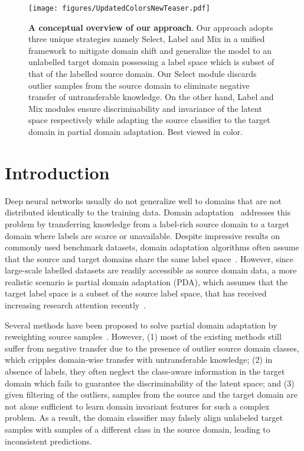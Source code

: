 \documentclass[10pt,twocolumn,letterpaper]{article}
\begin{document}
\begin{figure*}[!t]
	\begin{center}
	\texttt{[image: figures/UpdatedColorsNewTeaser.pdf]}
	\end{center}
	\vspace{-3mm}
	\caption{\small \textbf{A conceptual overview of our approach}. Our approach adopts three unique strategies namely Select, Label and Mix in a unified framework to mitigate domain shift and generalize the model to an unlabelled target domain possessing a label space which is subset of that of the labelled source domain. Our Select module discards outlier samples from the source domain to eliminate negative transfer of untransferable knowledge. On the other hand, Label and Mix modules ensure discriminability and invariance of the latent space respectively while adapting the source classifier to the target domain in partial domain adaptation. Best viewed in color.}
	\label{fig:teaser}
 	\vskip -0.1in
\end{figure*}
 

\section{Introduction}
\label{sec:introduction}

Deep neural networks 
usually do not generalize well to domains that are not distributed identically to the training data.
Domain adaptation~\cite{csurka2017domain, wang2018deep} addresses this problem by transferring knowledge from a label-rich source domain to a target domain where labels are scarce or unavailable.
Despite impressive results on commonly used benchmark datasets, domain adaptation algorithms often assume that the source and target domains share the same label space~\cite{ganin2015unsupervised, gretton2012kernel, long2015learning, long2018conditional, long2016unsupervised, shen2017wasserstein, sun2016deep}. However, since large-scale labelled datasets are readily accessible as source domain data, a more realistic scenario is partial domain adaptation (PDA), which assumes that the target label space is a subset of the source label space, that has received increasing research attention recently~\cite{bucci2019tackling, chen2019domain, chen2020selective, hu2019multi, xu2019larger, zhang2018importance}. 


Several methods have been proposed to solve partial domain adaptation by reweighting source samples~\cite{bucci2019tackling, chen2019domain, chen2020selective, hu2019multi, xu2019larger, zhang2018importance}. 
However, (1) most of the existing methods still suffer from negative transfer due to the presence of outlier source domain classes, 
which cripples domain-wise transfer with untransferable knowledge; (2) in absence of labels, they often neglect the class-aware information in the target domain which fails to guarantee the discriminability of the latent space; and (3) given filtering of the outliers, samples from the source and the target domain are not alone sufficient to learn domain invariant features for such a complex problem. As a result, the domain classifier may falsely align unlabeled target samples with samples of a different class in the source domain, leading to inconsistent predictions. 
\end{document}
